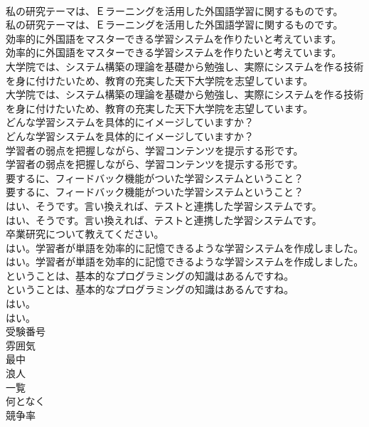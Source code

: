 \documentclass[8pt]{extreport}
\begin{document}
\begin{CJK}{UTF8}{min}
\\	私の研究テーマは、Ｅラーニングを活用した外国語学習に関するものです。	
\\	私の研究テーマは、Ｅラーニングを活用した外国語学習に関するものです。 
\\	効率的に外国語をマスターできる学習システムを作りたいと考えています。	
\\	効率的に外国語をマスターできる学習システムを作りたいと考えています。 
\\	大学院では、システム構築の理論を基礎から勉強し、実際にシステムを作る技術を身に付けたいため、教育の充実した天下大学院を志望しています。	
\\	大学院では、システム構築の理論を基礎から勉強し、実際にシステムを作る技術を身に付けたいため、教育の充実した天下大学院を志望しています。 
\\	どんな学習システムを具体的にイメージしていますか？	
\\	どんな学習システムを具体的にイメージしていますか？ 
\\	学習者の弱点を把握しながら、学習コンテンツを提示する形です。	
\\	学習者の弱点を把握しながら、学習コンテンツを提示する形です。 
\\	要するに、フィードバック機能がついた学習システムということ？	
\\	要するに、フィードバック機能がついた学習システムということ？ 
\\	はい、そうです。言い換えれば、テストと連携した学習システムです。	
\\	はい、そうです。言い換えれば、テストと連携した学習システムです。 
\\	卒業研究について教えてください。	
\\	はい。学習者が単語を効率的に記憶できるような学習システムを作成しました。	
\\	はい。学習者が単語を効率的に記憶できるような学習システムを作成しました。 
\\	ということは、基本的なプログラミングの知識はあるんですね。	
\\	ということは、基本的なプログラミングの知識はあるんですね。 
\\	はい。	
\\	はい。 
\\	受験番号
\\	雰囲気
\\	最中
\\	浪人
\\	一覧
\\	何となく
\\	競争率

\end{CJK}
\end{document}
